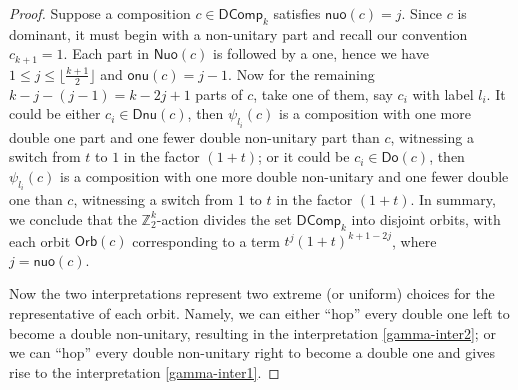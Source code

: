 \documentclass[reqno]{amsart}
\numberwithin{equation}{section}
\theoremstyle{definition}
\theoremstyle{named}
\newcommand{\bZ}{\mathbb{Z}}
\def\DComp{\mathsf{DComp}}
\def\nonu{\mathsf{nu}}
\def\Nuo{\mathsf{Nuo}}
\def\Dnu{\mathsf{Dnu}}
\def\Do{\mathsf{Do}}
\def\nuo{\mathsf{nuo}}
\def\onu{\mathsf{onu}}
\def\Orb{\mathsf{Orb}}
\begin{document}
\begin{proof}
Suppose a composition $c\in\DComp_k$ satisfies $\nuo(c)=j$. Since $c$ is dominant, it must begin with a non-unitary part and recall our convention $c_{k+1}=1$. Each part in $\Nuo(c)$ is followed by a one, hence we have $1\le j\le \lfloor\frac{k+1}{2}\rfloor$ and $\onu(c)=j-1$. Now for the remaining $k-j-(j-1)=k-2j+1$ parts of $c$, take one of them, say $c_i$ with label $l_i$. It could be either $c_i\in\Dnu(c)$, then $\psi_{l_i}(c)$ is a composition with one more double one part and one fewer double non-unitary part than $c$, witnessing a switch from $t$ to $1$ in the factor $(1+t)$; or it could be $c_i\in\Do(c)$, then $\psi_{l_i}(c)$ is a composition with one more double non-unitary and one fewer double one than $c$, witnessing a switch from $1$ to $t$ in the factor $(1+t)$. In summary, we conclude that the $\bZ^k_2$-action divides the set $\DComp_k$ into disjoint orbits, with each orbit $\Orb(c)$ corresponding to a term $t^j(1+t)^{k+1-2j}$, where $j=\nuo(c)$. 

Now the two interpretations represent two extreme (or uniform) choices for the representative of each orbit. Namely, we can either ``hop'' every double one left to become a double non-unitary, resulting in the interpretation \eqref{gamma-inter2}; or we can ``hop'' every double non-unitary right to become a double one and gives rise to the interpretation \eqref{gamma-inter1}.

\end{proof} 
\end{document}
